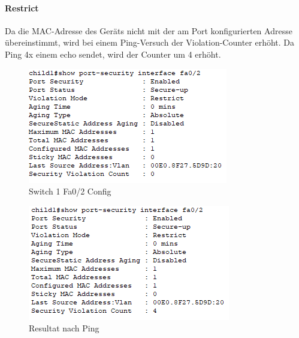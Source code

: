 \paragraph{Restrict}
Da die MAC-Adresse des Geräts nicht mit der am Port konfigurierten Adresse übereinstimmt, wird bei einem Ping-Versuch der Violation-Counter erhöht. Da Ping 4x einem echo sendet, wird der Counter um 4 erhöht. \\
\begin{figure}[!htb]
    \centering
    \includegraphics[width=.95\textwidth,keepaspectratio]{./img/config/security/restrict/Config.png}
    \caption{Switch 1 Fa0/2 Config}
\end{figure}
\begin{figure}[!htb]
    \centering
    \includegraphics[width=.95\textwidth,height=.5\textwidth,keepaspectratio]{./img/config/security/restrict/Result.png}
    \caption{Resultat nach Ping}
\end{figure}
\FloatBarrier

